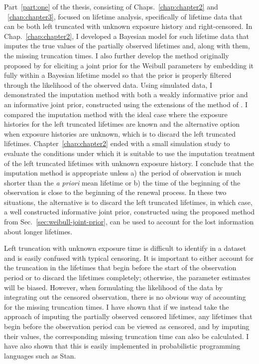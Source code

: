 Part~\ref{part:one} of the thesis, consisting of Chaps.~\ref{chap:chapter2} and ~\ref{chap:chapter3}, focused on lifetime analysis, specifically of lifetime data that can be both left truncated with unknown exposure history and right-censored. In Chap.~\ref{chap:chapter2}, I developed a Bayesian model for such lifetime data that imputes the true values of the partially observed lifetimes and, along with them, the missing truncation times. I also further develop the method originally proposed by \citet{kaminskiy2005} for eliciting a joint prior for the Weibull parameters by embedding it fully within a Bayesian lifetime model so that the prior is properly filtered through the likelihood of the observed data. Using simulated data, I demonstrated the imputation method with both a weakly informative prior and an informative joint prior, constructed using the extensions of the method of \citet{kaminskiy2005}. I compared the imputation method with the ideal case where the exposure histories for the left truncated lifetimes are known and the alternative option when exposure histories are unknown, which is to discard the left truncated lifetimes. Chapter~\ref{chap:chapter2} ended with a small simulation study to evaluate the conditions under which it is suitable to use the imputation treatment of the left truncated lifetimes with unknown exposure history. I conclude that the imputation method is appropriate unless a) the period of observation is much shorter than the \textit{a priori} mean lifetime or b) the time of the beginning of the observation is close to the beginning of the renewal process. In these two situations, the alternative is to discard the left truncated lifetimes, in which case, a well constructed informative joint prior, constructed using the proposed method from Sec.~\ref{sec:weibull-joint-prior}, can be used to account for the lost information about longer lifetimes.

Left truncation with unknown exposure time is difficult to identify in a dataset and is easily confused with typical censoring. It is important to either account for the truncation in the lifetimes that begin before the start of the observation period or to discard the lifetimes completely; otherwise, the parameter estimates will be biased. However, when formulating the likelihood of the data by integrating out the censored observation, there is no obvious way of accounting for the missing truncation times. I have shown that if we instead take the approach of imputing the partially observed censored lifetimes, any lifetimes that begin before the observation period can be viewed as censored, and by imputing their values, the corresponding missing truncation time can also be calculated. I have also shown that this is easily implemented in probabilistic programming languages such as Stan.

